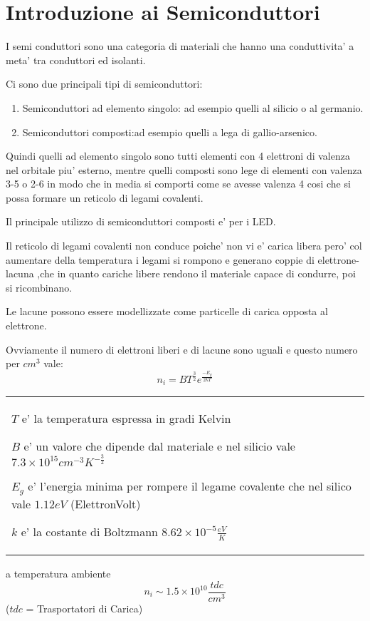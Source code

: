 \documentclass[\main/main.tex]{subfiles}
\begin{document}
\section{Introduzione ai Semiconduttori}
I semi conduttori sono una categoria di materiali che hanno una conduttivita' a meta' tra conduttori ed isolanti.

Ci sono due principali tipi di semiconduttori:
\begin{enumerate}  
	\item Semiconduttori ad elemento singolo: ad esempio quelli al silicio o al germanio.
	\item Semiconduttori composti:ad esempio quelli a lega di gallio-arsenico.
\end{enumerate}
Quindi quelli ad elemento singolo sono tutti elementi con 4 elettroni di valenza nel orbitale piu' esterno, mentre quelli composti sono lege di elementi con valenza 3-5 o 2-6 in modo che in media si comporti come se avesse valenza 4 cosi che si possa formare un reticolo di legami covalenti.

Il principale utilizzo di semiconduttori composti e' per i LED.

Il reticolo di legami covalenti non conduce poiche' non vi e' carica libera pero' col aumentare della temperatura i legami si rompono e generano coppie di elettrone-lacuna ,che in quanto cariche libere rendono il materiale capace di condurre, poi si ricombinano.

Le lacune possono essere modellizzate come particelle di carica opposta al elettrone.

Ovviamente il numero di elettroni liberi e di lacune sono uguali e questo numero per $cm^3$ vale:
\[n_i = BT^{\frac{3}{2}}e^{\frac{-E_g}{2kT}}\]
\begin{tabular}{l}
	$T$ e' la temperatura espressa in gradi Kelvin
	
	$B$ e' un valore che dipende dal materiale e nel silicio vale $7.3 \times 10^{15} cm^{-3} K^{-\frac{3}{2}}$
	
	$E_g$ e' l'energia minima per rompere il legame covalente che nel silico vale $1.12 eV$ (ElettronVolt)
	
	$k$ e' la costante di Boltzmann $8.62 \times 10^{-5} \frac{eV}{K}$
\end{tabular}
a temperatura ambiente \[n_i \sim 1.5 \times 10^{10} \frac{tdc}{cm^3}\]
($tdc$ = Trasportatori di Carica)
\clearpage
\end{document}
